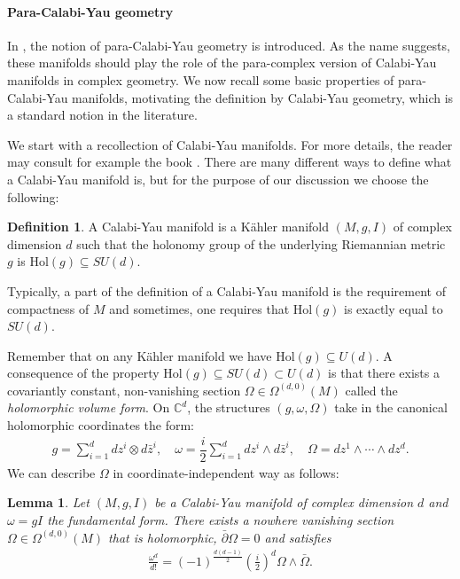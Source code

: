 \documentclass[letterpaper,12pt]{article}
\def\w{\wedge}
\newcommand{\p}{\partial}
\newtheorem{lemma}[theorem]{Lemma}
\theoremstyle{definition}
\newtheorem{Def}[theorem]{Definition}
\theoremstyle{remark}
\theoremstyle{examples}
\begin{document}
\paragraph{Para-Calabi-Yau geometry}

In \cite{mythesis}, the notion of para-Calabi-Yau geometry is introduced. As the name suggests, these manifolds should play the role of the para-complex version of Calabi-Yau manifolds in complex geometry. We now recall some basic properties of para-Calabi-Yau manifolds, motivating the definition by Calabi-Yau geometry, which is a standard notion in the literature.

We start with a recollection of Calabi-Yau manifolds. For more details, the reader may consult for example the book \cite{joyce2000compact}. There are many different ways to define what a Calabi-Yau manifold is, but for the purpose of our discussion we choose the following:
\begin{Def}
A Calabi-Yau manifold is a K\"ahler manifold $(M,g,I)$ of complex dimension $d$ such that the holonomy group of the underlying Riemannian metric $g$ is $\text{Hol}(g)\subseteq SU(d)$.
\end{Def}
Typically, a part of the definition of a Calabi-Yau manifold is the requirement of compactness of $M$ and sometimes, one requires that $\text{Hol}(g)$ is exactly equal to $SU(d)$.

Remember that on any K\"ahler manifold we have $\text{Hol}(g)\subseteq U(d)$. A consequence of the property $\text{Hol}(g)\subseteq SU(d)\subset U(d)$ is that there exists a covariantly constant, non-vanishing section $\Omega \in \Omega^{(d,0)}(M)$ called the {\it holomorphic volume form}. On $\mathbb{C}^d$, the structures $(g,\omega,\Omega)$ take in the canonical holomorphic coordinates the form:
\begin{align*}
    g=\sum_{i=1}^d dz^i\otimes d\bar{z}^i,\quad \omega=\dfrac{i}{2}\sum_{i=1}^d dz^i\w d\bar{z}^i,
 \quad   \Omega=dz^1\w\cdots\w dz^d.
\end{align*}
We can describe $\Omega$ in coordinate-independent way as follows:
\begin{lemma}\label{lem:CY}
Let $(M,g,I)$ be a Calabi-Yau manifold of complex dimension $d$ and $\omega=gI$ the fundamental form. There exists a nowhere vanishing section $\Omega \in \Omega^{(d,0)}(M)$ that is holomorphic, $\bar{\p}\Omega=0$ and satisfies
\begin{align*}
    \frac{\omega^d}{d!}=(-1)^\frac{d(d-1)}{2}\left(\frac{i}{2}\right)^d \Omega\w \bar{\Omega}.
\end{align*}
\end{lemma}
\end{document}

